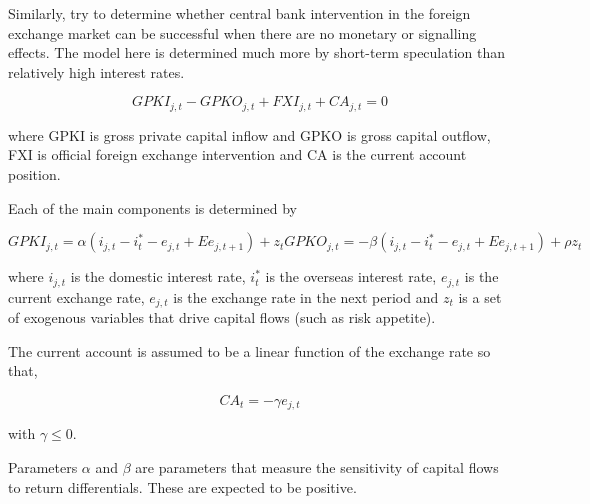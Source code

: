 \documentclass[12pt, a4paper, oneside]{article}\usepackage[]{graphicx}\usepackage[]{color}
\begin{document}
 
Similarly, \citet{Blanchardint} try to determine whether central bank intervention in the foreign exchange market can be successful when there are no monetary or signalling effects.  The model here is determined much more by short-term speculation than relatively high interest rates. 

\begin{equation}
GPKI_{j,t} - GPKO_{j,t} + FXI_{j,t} +CA_{j,t} = 0
\end{equation}

where GPKI is gross private capital inflow and GPKO is gross capital outflow, FXI is official foreign exchange intervention and CA is the current account position. 

Each of the main components is determined by 

\begin{subequations}
\begin{equation}
GPKI_{j,t} = \alpha (i_{j,t} - i^*_t - e_{j,t} +Ee_{j, t+1}) + z_t
\end{equation}
\begin{equation}
GPKO_{j,t} = -\beta (i_{j,t} - i^*_t - e_{j,t} + Ee_{j,t+1}) + \rho z_t
\end{equation}
\end{subequations}

where $i_{j,t}$ is the domestic interest rate, $i^*_t$ is the overseas interest rate, $e_{j,t}$ is the current exchange rate, $e_{j,t}$ is the exchange rate in the next period and $z_t$ is a set of exogenous variables that drive capital flows (such as risk appetite). 

The current account is assumed to be a linear function of the exchange rate so that, 

\begin{equation}
CA_t = -\gamma e_{j,t}
\end{equation} 

with $\gamma \leq 0$.  

Parameters $\alpha$ and $\beta$ are parameters that measure the sensitivity of capital flows to return differentials. These are expected to be positive.   
\end{document}
